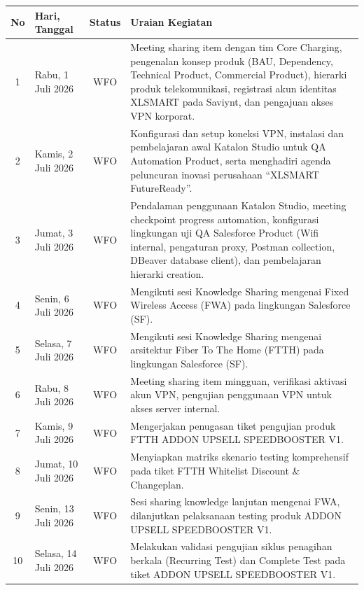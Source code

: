 \documentclass[12pt,a4paper]{article}
\begin{document}
\clearpage
\begin{singlespace}
\noindent
\begin{tabular}{|c|p{2.6cm}|c|p{9.8cm}|}
\hline
\textbf{No} & \textbf{Hari, Tanggal} & \textbf{Status} & \textbf{Uraian Kegiatan} \\
\hline
1 & Rabu, 1 Juli 2026 & WFO & Meeting sharing item dengan tim Core Charging, pengenalan konsep produk (BAU, Dependency, Technical Product, Commercial Product), hierarki produk telekomunikasi, registrasi akun identitas XLSMART pada Saviynt, dan pengajuan akses VPN korporat. \\
\hline
2 & Kamis, 2 Juli 2026 & WFO & Konfigurasi dan setup koneksi VPN, instalasi dan pembelajaran awal Katalon Studio untuk QA Automation Product, serta menghadiri agenda peluncuran inovasi perusahaan ``XLSMART FutureReady''. \\
\hline
3 & Jumat, 3 Juli 2026 & WFO & Pendalaman penggunaan Katalon Studio, meeting checkpoint progress automation, konfigurasi lingkungan uji QA Salesforce Product (Wifi internal, pengaturan proxy, Postman collection, DBeaver database client), dan pembelajaran hierarki creation. \\
\hline
4 & Senin, 6 Juli 2026 & WFO & Mengikuti sesi Knowledge Sharing mengenai Fixed Wireless Access (FWA) pada lingkungan Salesforce (SF). \\
\hline
5 & Selasa, 7 Juli 2026 & WFO & Mengikuti sesi Knowledge Sharing mengenai arsitektur Fiber To The Home (FTTH) pada lingkungan Salesforce (SF). \\
\hline
6 & Rabu, 8 Juli 2026 & WFO & Meeting sharing item mingguan, verifikasi aktivasi akun VPN, pengujian penggunaan VPN untuk akses server internal. \\
\hline
7 & Kamis, 9 Juli 2026 & WFO & Mengerjakan penugasan tiket pengujian produk FTTH ADDON UPSELL SPEEDBOOSTER V1. \\
\hline
8 & Jumat, 10 Juli 2026 & WFO & Menyiapkan matriks skenario testing komprehensif pada tiket FTTH Whitelist Discount \& Changeplan. \\
\hline
9 & Senin, 13 Juli 2026 & WFO & Sesi sharing knowledge lanjutan mengenai FWA, dilanjutkan pelaksanaan testing produk ADDON UPSELL SPEEDBOOSTER V1. \\
\hline
10 & Selasa, 14 Juli 2026 & WFO & Melakukan validasi pengujian siklus penagihan berkala (Recurring Test) dan Complete Test pada tiket ADDON UPSELL SPEEDBOOSTER V1. \\

\end{tabular}
\end{singlespace}
\end{document}
